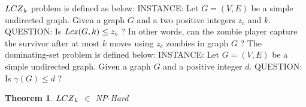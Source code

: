 \documentclass[1p]{elsarticle}
\newtheorem{theorem}{Theorem}
\newcommand{\NPZ}{\ooalign{$Z$\cr\hfil\rule[.8ex]{.3em}{.09ex}\hfil\cr}}
\newcommand{\zn}{\ooalign{$z$\cr\hfil\rule[.5ex]{.2em}{.08ex}\hfil\cr}}
\begin{document}
	$LC\NPZ_k$ problem is defined as below:
	{\newline}
	INSTANCE: Let $G = (V,E)$ be a simple undirected graph. Given a graph $G$ and a two positive integers $z_c$ and $k$.
	{\newline}
	QUESTION: Is $Lc\zn(G,k) \leq z_c$ ? In other words, can the zombie player capture the survivor after at most $k$ moves using 
	$z_c$ zombies in graph $G$ ?
	{\newline}
	{\newline}
	The dominating-set problem is defined below:
	{\newline}
	INSTANCE: Let $G = (V,E)$ be a simple undirected graph. Given a graph $G$ and a positive integer $d$.
	{\newline}
	QUESTION: Is $\gamma(G) \leq d$ ?

	\begin{theorem}
		$LC\NPZ_k$ $\in$ NP-Hard
	\end{theorem}
\end{document}
